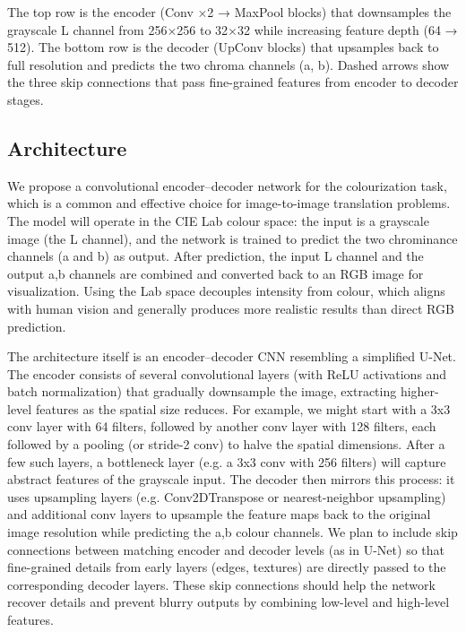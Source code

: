 \documentclass{article} %
\begin{document}
The top row is the encoder (Conv ×2 → MaxPool blocks) that downsamples the grayscale L channel from 256×256 to 32×32 while increasing feature depth (64 → 512).
The bottom row is the decoder (UpConv blocks) that upsamples back to full resolution and predicts the two chroma channels (a, b). Dashed arrows show the three skip connections that pass fine-grained features from encoder to decoder stages.

\subsection{Architecture}

We propose a convolutional encoder–decoder network for the colourization task, which is a common and effective choice for image-to-image translation problems. \cite{leatvanich2025image} The model will operate in the CIE Lab colour space: the input is a grayscale image (the L channel), and the network is trained to predict the two chrominance channels (a and b) as output. After prediction, the input L channel and the output a,b channels are combined and converted back to an RGB image for visualization. Using the Lab space decouples intensity from colour, which aligns with human vision and generally produces more realistic results than direct RGB prediction. \cite{leatvanich2025image}

The architecture itself is an encoder–decoder CNN resembling a simplified U-Net. The encoder consists of several convolutional layers (with ReLU activations and batch normalization) that gradually downsample the image, extracting higher-level features as the spatial size reduces. For example, we might start with a 3x3 conv layer with 64 filters, followed by another conv layer with 128 filters, each followed by a pooling (or stride-2 conv) to halve the spatial dimensions. After a few such layers, a bottleneck layer (e.g. a 3x3 conv with 256 filters) will capture abstract features of the grayscale input. The decoder then mirrors this process: it uses upsampling layers (e.g. Conv2DTranspose or nearest-neighbor upsampling) and additional conv layers to upsample the feature maps back to the original image resolution while predicting the a,b colour channels. We plan to include skip connections between matching encoder and decoder levels (as in U-Net) so that fine-grained details from early layers (edges, textures) are directly passed to the corresponding decoder layers. These skip connections should help the network recover details and prevent blurry outputs by combining low-level and high-level features. \cite{leatvanich2025image}
\end{document}
